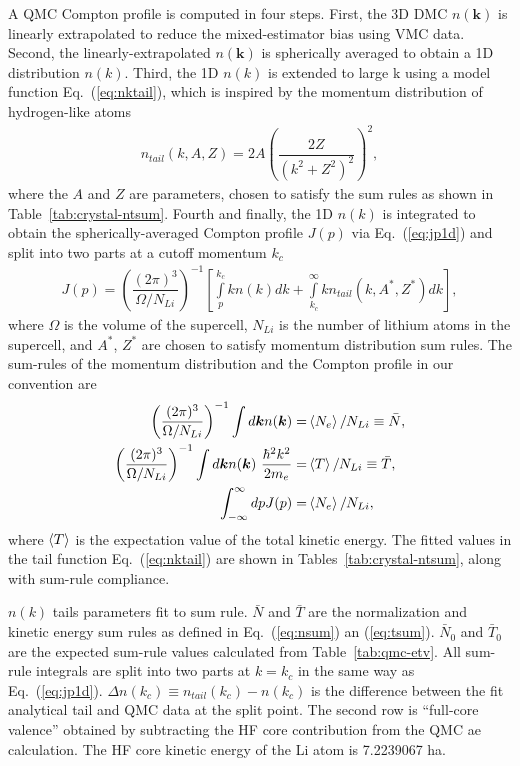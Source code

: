 \documentclass[aps,prl,superscriptaddress]{revtex4-1}
\newcommand{\bs}{\boldsymbol}
\begin{document}
A QMC Compton profile is computed in four steps. First, the 3D DMC $n(\bs{k})$ is linearly extrapolated to reduce the mixed-estimator bias using VMC data. Second, the linearly-extrapolated $n(\bs{k})$ is spherically averaged to obtain a 1D distribution $n(k)$. Third, the 1D $n(k)$ is extended to large k using a model function Eq.~(\ref{eq:nktail}), which is inspired by the momentum distribution of hydrogen-like atoms
\begin{align} \label{eq:nktail}
n_{tail}(k, A, Z) = 2A\left(\dfrac{2Z}{(k^2+Z^2)^2}\right)^2,
\end{align}
where the $A$ and $Z$ are parameters, chosen to satisfy the sum rules as shown in Table~\ref{tab:crystal-ntsum}. Fourth and finally, the 1D $n(k)$ is integrated to obtain the spherically-averaged Compton profile $J(p)$ via Eq.~(\ref{eq:jp1d}) and split into two parts at a cutoff momentum $k_c$
\begin{align} \label{eq:jp1d}
J(p) = \left( \dfrac{(2\pi)^3}{\Omega/N_{Li}} \right)^{-1} \left[
\int\limits_p^{k_c} k n(k) dk + \int\limits_{k_c}^{\infty} k n_{tail}(k, A^*, Z^*) dk
\right],
\end{align}
where $\Omega$ is the volume of the supercell, $N_{Li}$ is the number of lithium atoms in the supercell, and $A^*$, $Z^*$ are chosen to satisfy momentum distribution sum rules. %
The sum-rules of the momentum distribution and the Compton profile in our convention are
\begin{align}
\left( \dfrac{(2\pi)^3}{\Omega/N_{Li}} \right)^{-1} \int d\bs{k} n(\bs{k}) =& \braket{N_e}/N_{Li}\equiv \bar{N}, \label{eq:nsum} \\
\left( \dfrac{(2\pi)^3}{\Omega/N_{Li}} \right)^{-1} \int d\bs{k} n(\bs{k})~\frac{\hbar^2k^2}{2m_e} =& \braket{T}/N_{Li} \equiv \bar{T}, \label{eq:tsum} \\
\int_{-\infty}^{\infty} dp J(p) =& \braket{N_e}/N_{Li}, \label{eq:jpsum}
\end{align}
where $\braket{T}$ is the expectation value of the total kinetic energy.
The fitted values in the tail function Eq.~(\ref{eq:nktail}) are shown in Tables~\ref{tab:crystal-ntsum}, along with sum-rule compliance.

\begin{table}[h]
\caption{$n(k)$ tails parameters fit to sum rule. $\bar{N}$ and $\bar{T}$ are the normalization and kinetic energy sum rules as defined in Eq.~(\ref{eq:nsum}) an (\ref{eq:tsum}). $\bar{N}_0$ and $\bar{T}_0$ are the expected sum-rule values calculated from Table~\ref{tab:qmc-etv}. All sum-rule integrals are split into two parts at $k=k_c$ in the same way as Eq.~(\ref{eq:jp1d}). $\Delta n(k_c)\equiv n_{tail}(k_c)-n(k_c)$ is the difference between the fit analytical tail and QMC data at the split point. The second row is ``full-core valence'' obtained by subtracting the HF core contribution from the QMC ae calculation. The HF core kinetic energy of the Li atom is 7.2239067 ha.}

\label{tab:crystal-ntsum}
\end{table}
\end{document}
